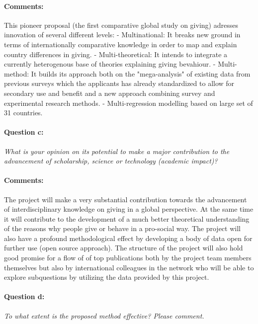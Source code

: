 \documentclass[twocolumn, serif, rga, numeric]{jote-article}
\begin{document}
\paragraph{Comments:}
This pioneer proposal (the first comparative global study on giving) adresses innovation of several different levels:
- Multinational: It breaks new ground in terms of internationally comparative knowledge in order to map and explain country differences in giving.
- Multi-theoretical: It intends to integrate a currently heterogenous base of theories explaining giving bevahiour.
- Multi-method: It builds its approach both on the "mega-analysis" of existing data from previous surveys which the applicants has already standardized to allow for secondary use and benefit and a new approach combining survey and experimental research methods.
- Multi-regression modelling based on large set of 31 countries.
\paragraph{Question c:}
\textit{What is your opinion on its potential to make a major contribution to the advancement of scholarship, science or technology (academic impact)?}
\paragraph{Comments:}
The project will make a very substantial contribution towards the advancement of interdisciplinary knowledge on giving in a global perspective. At the same time it will contribute to the development of a much better theoretical understanding of the reasons why people give or behave in a pro-social way. The project will also have a profound methodological effect by developing a body of data open for further use (open source approach). The structure of the project will also hold good promise for a flow of of top publications both by the project team members themselves but also by international colleagues in the network who will be able to explore subquestions by utilizing the data provided by this project.
\paragraph{Question d:}
\textit{To what extent is the proposed method effective? Please comment.}
\end{document}
